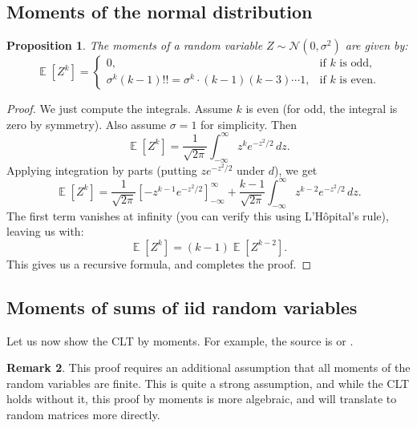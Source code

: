\documentclass[letterpaper,11pt,oneside,reqno]{article}
\numberwithin{equation}{section}
\newtheorem{proposition}{Proposition}[section]
\theoremstyle{definition}
\newtheorem{remark}[proposition]{Remark}
\begin{document}
\subsection{Moments of the normal distribution}

\begin{proposition}
The moments of a random variable $Z \sim \mathcal{N}(0, \sigma^2)$ are given by:
\begin{equation}
	\label{eq:normal-moments}
	\operatorname{\mathbb{E}}[Z^k] = \begin{cases}
		0, & \text{if } k \text{ is odd}, \\
		\sigma^k (k-1)!! = \sigma^k \cdot (k-1)(k-3) \cdots 1, & \text{if } k \text{ is even}.
	\end{cases}
\end{equation}
\end{proposition}
\begin{proof}
	We just compute the integrals. Assume $k$ is even (for odd,
	the integral is zero by symmetry). Also assume $\sigma = 1$ for simplicity.
	Then
\begin{equation*}
	\operatorname{\mathbb{E}}[Z^k]
	=
	\frac{1}{\sqrt{2\pi}}
	\int_{-\infty}^{\infty}  z^k e^{-z^2/2} \, dz.
\end{equation*}
Applying integration by parts (putting $ze^{-z^2/2}$ under $d$), we get
\begin{equation*}
	\operatorname{\mathbb{E}}[Z^k] = \frac{1}{\sqrt{2\pi}} \left[-z^{k-1}e^{-z^2/2}\right]_{-\infty}^{\infty} + \frac{k-1}{\sqrt{2\pi}} \int_{-\infty}^{\infty} z^{k-2} e^{-z^2/2} \, dz.
\end{equation*}
The first term vanishes at infinity (you can verify this using L'Hôpital's rule), leaving us with:
\begin{equation*}
	\operatorname{\mathbb{E}}[Z^k] = (k-1)\operatorname{\mathbb{E}}[Z^{k-2}].
\end{equation*}
This gives us a recursive formula, and completes the proof.
\end{proof}


\subsection{Moments of sums of iid random variables}

Let us now show the CLT by moments.
For example, the source is
\cite[Section~30]{billingsley1995probability}
or \cite{filmus2010two}.


\begin{remark}
	This proof requires an additional assumption
	that all moments of the random variables are finite.
	This is quite a strong assumption, and while the CLT holds
	without it, this proof by moments is more algebraic, and
	will translate to random matrices more directly.
\end{remark}
\end{document}

